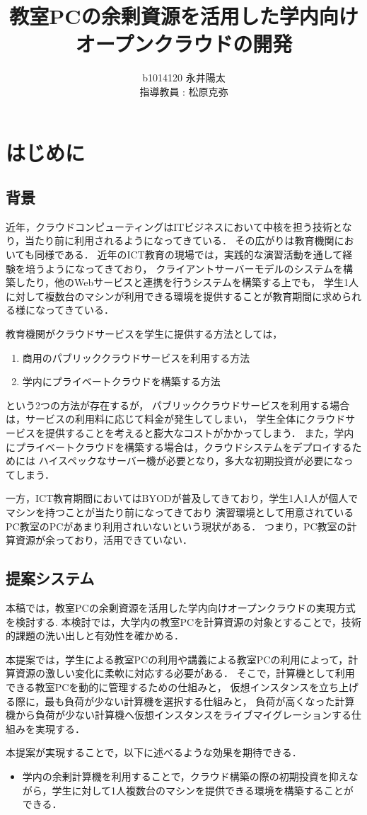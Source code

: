 \documentclass[11pt,a4]{jsarticle}
\author{%
b1014120 永井陽太\\指導教員 : 松原克弥
}
\title{教室PCの余剰資源を活用した学内向けオープンクラウドの開発}
\begin{document}
\maketitle

\section{はじめに}
\subsection{背景}
近年，クラウドコンピューティングはITビジネスにおいて中核を担う技術となり，当たり前に利用されるようになってきている．
その広がりは教育機関においても同様である．
近年のICT教育の現場では，実践的な演習活動を通して経験を培うようになってきており，
クライアントサーバーモデルのシステムを構築したり，他のWebサービスと連携を行うシステムを構築する上でも，
学生1人に対して複数台のマシンが利用できる環境を提供することが教育期間に求められる様になってきている．
\par 教育機関がクラウドサービスを学生に提供する方法としては，
\begin{enumerate}
	\item 商用のパブリッククラウドサービスを利用する方法
	\item 学内にプライベートクラウドを構築する方法
\end{enumerate}
という2つの方法が存在するが，
パブリッククラウドサービスを利用する場合は，サービスの利用料に応じて料金が発生してしまい，
学生全体にクラウドサービスを提供することを考えると膨大なコストがかかってしまう．
また，学内にプライベートクラウドを構築する場合は，クラウドシステムをデプロイするためには
ハイスペックなサーバー機が必要となり，多大な初期投資が必要になってしまう．
\par 一方，ICT教育期間においてはBYODが普及してきており，学生1人1人が個人でマシンを持つことが当たり前になってきており
演習環境として用意されているPC教室のPCがあまり利用されいないという現状がある．
つまり，PC教室の計算資源が余っており，活用できていない．
\subsection{提案システム}
本稿では，教室PCの余剰資源を活用した学内向けオープンクラウドの実現方式を検討する.
本検討では，大学内の教室PCを計算資源の対象とすることで，技術的課題の洗い出しと有効性を確かめる．
\par 本提案では，学生による教室PCの利用や講義による教室PCの利用によって，計算資源の激しい変化に柔軟に対応する必要がある．
そこで，計算機として利用できる教室PCを動的に管理するための仕組みと，
仮想インスタンスを立ち上げる際に，最も負荷が少ない計算機を選択する仕組みと，
負荷が高くなった計算機から負荷が少ない計算機へ仮想インスタンスをライブマイグレーションする仕組みを実現する．
\par 本提案が実現することで，以下に述べるような効果を期待できる．
\begin{itemize}
	\item 学内の余剰計算機を利用することで，クラウド構築の際の初期投資を抑えながら，学生に対して1人複数台のマシンを提供できる環境を構築することができる．
\end{itemize}
\end{document}
